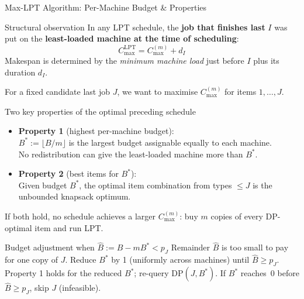 \documentclass[fleqn,11pt,aspectratio=43]{beamer}
\newcommand{\Clpt}{C_{\max}^{\mathrm{LPT}}}
\begin{document}
\begin{frame}[shrink=40]{Max-LPT Algorithm: Per-Machine Budget \& Properties}
    \begin{block}{Structural observation}
    In any LPT schedule, the \textbf{job that finishes last} $I$ was put on the \textbf{least-loaded machine at the time of scheduling}:
    \[\Clpt = C_{\max}^{(m)} + d_I\]
    Makespan is determined by the \emph{minimum machine load} just before $I$ plus its duration $d_I$.
  \end{block}
  For a fixed candidate last job $J$, we want to maximise $C_{\max}^{(m)}$ for items $1,\ldots,J$.
  \begin{block}{Two key properties of the optimal preceding schedule}
    \begin{itemize}
      \item \textbf{Property 1} (highest per-machine budget):\\
            $B^* := \lfloor B/m \rfloor$ is the largest budget assignable equally to each machine.\\
            No redistribution can give the least-loaded machine more than $B^*$.
      \item \textbf{Property 2} (best items for $B^*$):\\
            Given budget $B^*$, the optimal item combination from types $\leq J$ is the unbounded knapsack optimum.
    \end{itemize}
    If both hold, no schedule achieves a larger $C_{\max}^{(m)}$: buy $m$ copies of every DP-optimal item and run LPT.
  \end{block}
  \begin{block}{Budget adjustment when $\hat{B} := B - mB^* < p_J$}
    \small Remainder $\hat{B}$ is too small to pay for one copy of $J$.
    Reduce $B^*$ by 1 (uniformly across machines) until $\hat{B} \geq p_J$.
    Property 1 holds for the reduced $B^*$; re-query $\mathrm{DP}(J,B^*)$.
    If $B^*$ reaches~0 before $\hat{B} \geq p_J$, skip $J$ (infeasible).
  \end{block}
\end{frame}
\end{document}
